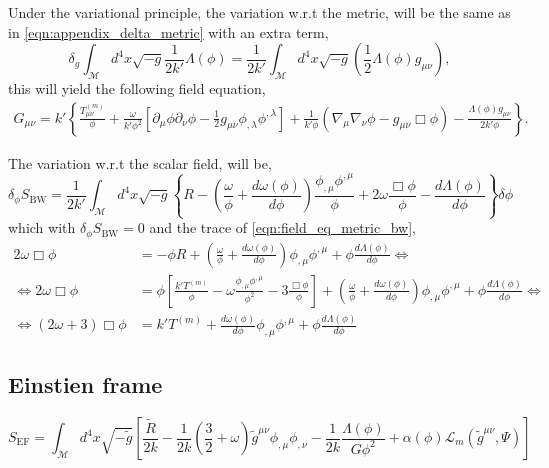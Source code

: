 Under the variational principle, the variation w.r.t the metric, will be the same as in \cref{eqn:appendix_delta_metric} with an extra term,
\begin{equation}
    \delta_g \int_{\mathcal{M}}d^4x\sqrt{-g}\frac{1}{2k'}\Lambda(\phi) = \frac{1}{2k'}\int_{\mathcal{M}}d^4x\sqrt{-g}\left(\frac{1}{2}\Lambda(\phi)g_{\mu\nu}\right),
\end{equation}
this will yield the following field equation,
\begin{align}
G_{\mu\nu}=k'\left\{\frac{T_{\mu\nu}^{(m)}}{\phi}+\frac{\omega}{k'\phi^2}\left[\partial_\mu \phi \partial_\nu \phi-\frac{1}{2}g_{\mu\nu}\phi_{,\lambda}\phi^{,\lambda}\right]+\frac{1}{k'\phi}\left(\nabla_\mu\nabla_\nu\phi-g_{\mu\nu}\Box\phi\right)-\frac{\Lambda(\phi)g_{\mu\nu}}{2k'\phi}\right\}.
\label{eqn:field_eq_metric_bw}
\end{align}

The variation w.r.t the scalar field, will be,
\begin{equation}
    \delta_\phi S_{\mathrm{BW}}=\frac{1}{2k'}\int_{\mathcal{M}} d^4x\sqrt{-g}\left\{ R-\left(\frac{\omega}{\phi}+\frac{d\omega(\phi)}{d\phi}\right)\frac{\phi_{,\mu}\phi^{,\mu}}{\phi}+2\omega\frac{\Box\phi}{\phi}-\frac{d\Lambda(\phi)}{d\phi}\right\}\delta\phi
    \label{eqn:delta_phi_bw}
\end{equation}
which with $\delta_\phi S_{\mathrm{BW}}=0$ and the trace of \cref{eqn:field_eq_metric_bw},
\begin{align}
    2\omega\Box\phi&=-\phi R+\left(\frac{\omega}{\phi}+\frac{d\omega(\phi)}{d\phi}\right)\phi_{,\mu}\phi^{,\mu}+\phi\frac{d\Lambda(\phi)}{d\phi}\Leftrightarrow\nonumber\\
    \Leftrightarrow 2\omega\Box\phi&=\phi\left[\frac{k'T^{(m)}}{\phi}-\omega\frac{\phi_{,\mu}\phi^{,\mu}}{\phi^2}-3\frac{\Box\phi}{\phi}\right]+\left(\frac{\omega}{\phi}+\frac{d\omega(\phi)}{d\phi}\right)\phi_{,\mu}\phi^{,\mu}+\phi\frac{d\Lambda(\phi)}{d\phi}\Leftrightarrow\nonumber\\
    \Leftrightarrow (2\omega+3)\Box\phi &=k' T^{(m)}+\frac{d\omega(\phi)}{d\phi}\phi_{,\mu}\phi^{,\mu}+\phi\frac{d\Lambda(\phi)}{d\phi}
\end{align}


\subsection{Einstien frame}

\begin{equation}
    S_{\text{EF}}=\int_{\mathcal{M}}d^4x \sqrt{-\tilde{g}}\left[\frac{\tilde{R}}{2k}-\frac{1}{2k}\left(\frac{3}{2}+\omega\right)\tilde{g}^{\mu\nu}\phi_{,\mu}\phi_{,\nu}-\frac{1}{2k}\frac{\Lambda(\phi)}{G\phi^2}+\alpha(\phi)\mathcal{L}_m(\tilde{g}^{\mu\nu},\Psi)\right]
\end{equation}


